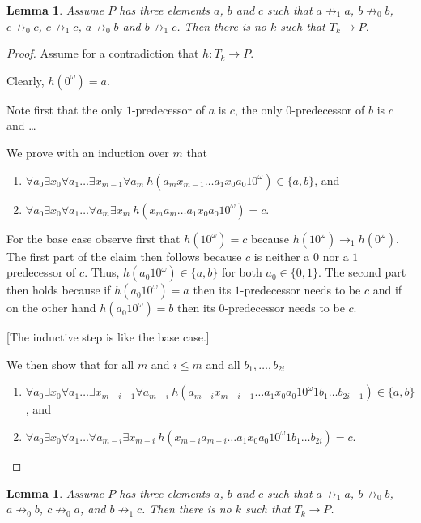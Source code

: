 \documentclass[a4paper]{article}
\newtheorem{lemma}[theorem]{Lemma}
\begin{document}
\begin{lemma} \label{first killer lemma}
 Assume $P$ has three elements $a$, $b$ and $c$ such that $a \not
\rightarrow_1 a$, $b \not \rightarrow_0 b$, $c \not \rightarrow_0 c$,
$c \not \rightarrow_1 c$, $a \not \rightarrow_0 b$ and $b \not
\rightarrow_1 c$. Then there is no $k$ such that $T_k \to P$.
\end{lemma}
\begin{proof}
 Assume for a contradiction that $h : T_k \to P$.

Clearly, $h(0^\omega) = a$.

Note first that the only $1$-predecessor of $a$ is $c$, the only
$0$-predecessor of $b$ is $c$ and \dots

We prove with an induction over $m$ that
\begin{enumerate}
 \item \label{first item} $\forall a_0 \exists x_0 \forall a_1 \dots
\exists x_{m - 1} \forall a_m \  h(a_m x_{m - 1} \dots a_1 x_0 a_0 1
0^\omega) \in \{a, b\}$, and
 \item \label{second item} $\forall a_0 \exists x_0 \forall a_1 \dots
\forall a_m \exists x_m \  h(x_m a_m \dots a_1 x_0 a_0 1 0^\omega) = c$.
\end{enumerate}
For the base case observe first that $h(10^\omega) = c$ because
$h(10^\omega) \rightarrow_1 h(0^\omega)$. The first part of the claim
then follows because $c$ is neither a $0$ nor a $1$ predecessor of $c$.
Thus, $h(a_0 1 0^\omega) \in \{a, b\}$ for both $a_0 \in \{0,1\}$. The
second part then holds because if $h(a_0 1 0^\omega) = a$ then its
$1$-predecessor needs to be $c$ and if on the other hand $h(a_0 1
0^\omega) = b$ then its $0$-predecessor needs to be $c$.

[The inductive step is like the base case.]

We then show that for all $m$ and $i \leq m$ and all $b_1,\dots,b_{2i}$
\begin{enumerate}
 \item \label{first power item} $\forall a_0 \exists x_0 \forall a_1 \dots
\exists x_{m - i - 1} \forall a_{m - i} \  h(a_{m - i} x_{m - i - 1}
\dots a_1 x_0 a_0 1 0^\omega 1 b_1\dots b_{2i - 1}) \in \{a, b\}$, and
 \item \label{second power item} $\forall a_0 \exists x_0 \forall a_1
\dots \forall a_{m - i} \exists x_{m - i} \  h(x_{m - i} a_{m - i} \dots
a_1 x_0 a_0 1 0^\omega 1 b_1 \dots b_{2i}) = c$.
\end{enumerate}


\end{proof}

\begin{lemma} \label{second killer lemma}
 Assume $P$ has three elements $a$, $b$ and $c$ such that $a \not
\rightarrow_1 a$, $b \not \rightarrow_0 b$, $a \not \rightarrow_0 b$, $c
\not \rightarrow_0 a$, and $b \not \rightarrow_1 c$. Then there is no
$k$ such that $T_k \to P$.
\end{lemma}
\end{document}
